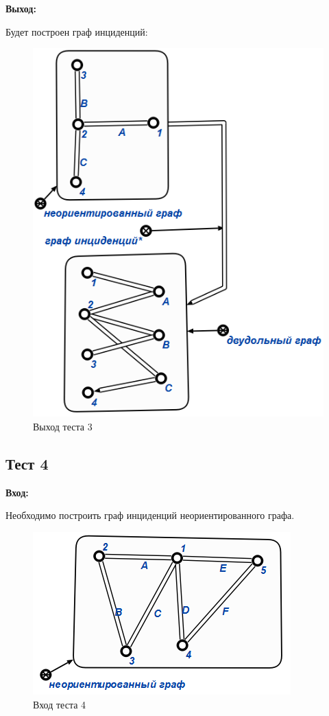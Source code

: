\textbf{Выход:}

Будет построен граф инциденций:

\begin{figure}[H]
  \centering
  \includegraphics[scale=0.7]{images/18.png}
  \caption{Выход теста 3}
\end{figure}

\subsection{Тест 4}

\textbf{Вход:}

Необходимо построить граф инциденций неориентированного графа.

\begin{figure}[H]
  \centering
  \includegraphics[scale=0.7]{images/19.png}
  \caption{Вход теста 4}
\end{figure}

